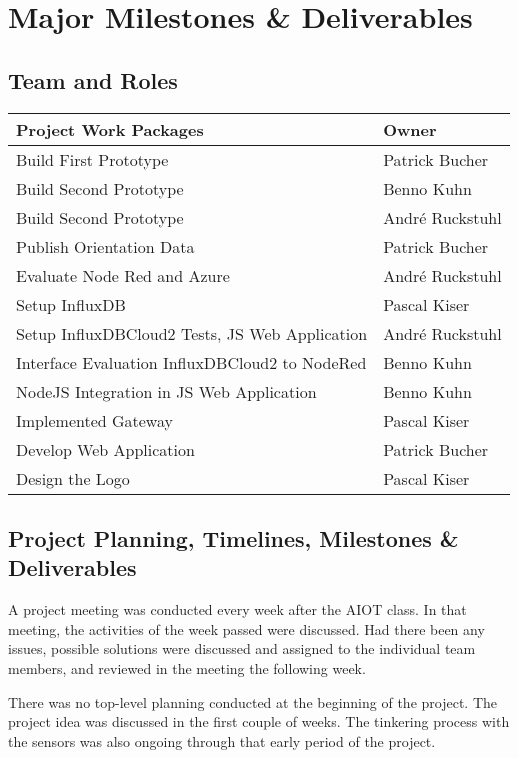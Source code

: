 \section{Major Milestones \& Deliverables}

\subsection{Team and Roles}

\begin{tabular}{p{9cm}p{4cm}}
\textbf{Project Work Packages} & \textbf{Owner} \\
\hline
    Build First Prototype & Patrick Bucher \\
    Build Second Prototype & Benno Kuhn \\
    Build Second Prototype & André Ruckstuhl \\
    Publish Orientation Data & Patrick Bucher \\
    Evaluate Node Red and Azure & André Ruckstuhl \\
    Setup InfluxDB & Pascal Kiser \\
    Setup InfluxDBCloud2 Tests, JS Web Application & André Ruckstuhl \\
    Interface Evaluation InfluxDBCloud2 to NodeRed & Benno Kuhn \\
    NodeJS Integration in JS Web Application & Benno Kuhn \\
    Implemented Gateway & Pascal Kiser \\
    Develop Web Application & Patrick Bucher \\
    Design the Logo & Pascal Kiser \\
\end{tabular}

\subsection{Project Planning, Timelines, Milestones \& Deliverables}

A project meeting was conducted every week after the AIOT class. In that meeting, the activities of the week passed were discussed. Had there been any issues, possible solutions were discussed and assigned to the individual team members, and reviewed in the meeting the following week.

There was no top-level planning conducted at the beginning of the project. The project idea was discussed in the first couple of weeks. The tinkering process with the sensors was also ongoing through that early period of the project.

